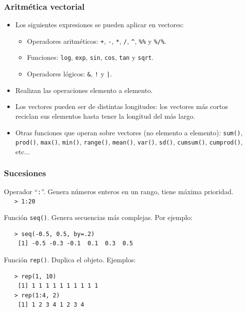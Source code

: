 \documentclass{beamer}
\newenvironment{wideitemize}{\itemize\addtolength{\itemsep}{10pt}}{\enditemize}
\begin{document}
\begin{frame}
\frametitle{Aritmética vectorial}

\begin{itemize}
\item Los siguientes expresiones se pueden aplicar en vectores:
\begin{itemize}
\item Operadores aritméticos: \texttt{+}, \texttt{-}, \texttt{*}, \texttt{/}, \texttt{\^}, \texttt{\%\%} y \texttt{\%/\%}.
\item Funciones: \texttt{log}, \texttt{exp}, \texttt{sin}, \texttt{cos}, \texttt{tan} y \texttt{sqrt}.
\item Operadores lógicos: \texttt{\&}, \texttt{!} y \texttt{|}.
\end{itemize}
\item Realizan las operaciones elemento a elemento.
\item Los vectores pueden ser de distintas longitudes: los vectores más cortos reciclan sus elementos hasta tener la longitud del más largo.
\item Otras funciones que operan sobre vectores (no elemento a elemento): \texttt{sum()}, \texttt{prod()}, \texttt{max()}, \texttt{min()}, \texttt{range()}, \texttt{mean()}, \texttt{var()}, \texttt{sd()}, \texttt{cumsum()}, \texttt{cumprod()}, etc...
\end{itemize}
\end{frame}

\begin{frame}[fragile]
\frametitle{Sucesiones}

\begin{wideitemize}
\item Operador ``\texttt{:}''. Genera números enteros en un rango, tiene máxima prioridad. \\ \verb+   > 1:20+
\item Función \texttt{seq()}. Genera secuencias más complejas. Por ejemplo:
\begin{verbatim}
   > seq(-0.5, 0.5, by=.2)
    [1] -0.5 -0.3 -0.1  0.1  0.3  0.5
\end{verbatim}
\item Función \texttt{rep()}. Duplica el objeto. Ejemplos:
\begin{verbatim}
   > rep(1, 10)
    [1] 1 1 1 1 1 1 1 1 1 1
   > rep(1:4, 2)
    [1] 1 2 3 4 1 2 3 4
\end{verbatim}
\end{wideitemize}
\end{frame}
\end{document}

